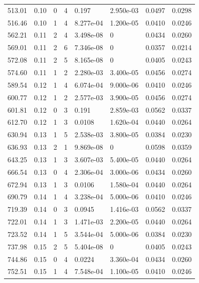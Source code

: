 \documentclass[preview]{standalone}
\begin{document}
{{{\begin{tabular}{L{1.2cm}C{1.2cm} C{0.3cm}C{0.5cm} C{1.4cm}C{1.4cm} C{1.4cm}C{1.4cm}}
  513.01  &  0.10  & 0     &  4 &  0.197  & 2.950e-03  & 0.0497 &  0.0298   \\ 
  516.46  &  0.10  & 1     &  4 &  8.277e-04  & 1.200e-05  & 0.0410 &  0.0246   \\ 
  562.21  &  0.11  & 2     &  4 &  3.498e-08  & 0  & 0.0434 &  0.0260   \\ 
  569.01  &  0.11  & 2     &  6 &  7.346e-08  & 0  & 0.0357 &  0.0214   \\ 
  572.08  &  0.11  & 2     &  5 &  8.165e-08  & 0  & 0.0405 &  0.0243   \\ 
  574.60  &  0.11  & 1     &  2 &  2.280e-03  & 3.400e-05  & 0.0456 &  0.0274   \\ 
  589.54  &  0.12  & 1     &  4 &  6.074e-04  & 9.000e-06  & 0.0410 &  0.0246   \\ 
  600.77  &  0.12  & 1     &  2 &  2.577e-03  & 3.900e-05  & 0.0456 &  0.0274   \\ 
  601.81  &  0.12  & 0     &  3 &  0.191  & 2.859e-03  & 0.0562 &  0.0337   \\ 
  612.70  &  0.12  & 1     &  3 &  0.0108  & 1.620e-04  & 0.0440 &  0.0264   \\ 
  630.94  &  0.13  & 1     &  5 &  2.538e-03  & 3.800e-05  & 0.0384 &  0.0230   \\ 
  636.93  &  0.13  & 2     &  1 &  9.869e-08  & 0  & 0.0598 &  0.0359   \\ 
  643.25  &  0.13  & 1     &  3 &  3.607e-03  & 5.400e-05  & 0.0440 &  0.0264   \\ 
  666.54  &  0.13  & 0     &  4 &  2.306e-04  & 3.000e-06  & 0.0434 &  0.0260   \\ 
  672.94  &  0.13  & 1     &  3 &  0.0106  & 1.580e-04  & 0.0440 &  0.0264   \\ 
  690.79  &  0.14  & 1     &  4 &  3.238e-04  & 5.000e-06  & 0.0410 &  0.0246   \\ 
  719.39  &  0.14  & 0     &  3 &  0.0945  & 1.416e-03  & 0.0562 &  0.0337   \\ 
  722.01  &  0.14  & 1     &  3 &  1.471e-03  & 2.200e-05  & 0.0440 &  0.0264   \\ 
  723.52  &  0.14  & 1     &  5 &  3.544e-04  & 5.000e-06  & 0.0384 &  0.0230   \\ 
  737.98  &  0.15  & 2     &  5 &  5.404e-08  & 0  & 0.0405 &  0.0243   \\ 
  744.86  &  0.15  & 0     &  4 &  0.0224  & 3.360e-04  & 0.0434 &  0.0260   \\ 
  752.51  &  0.15  & 1     &  4 &  7.548e-04  & 1.100e-05  & 0.0410 &  0.0246   \\ 

\end{tabular}}}}
\end{document}
